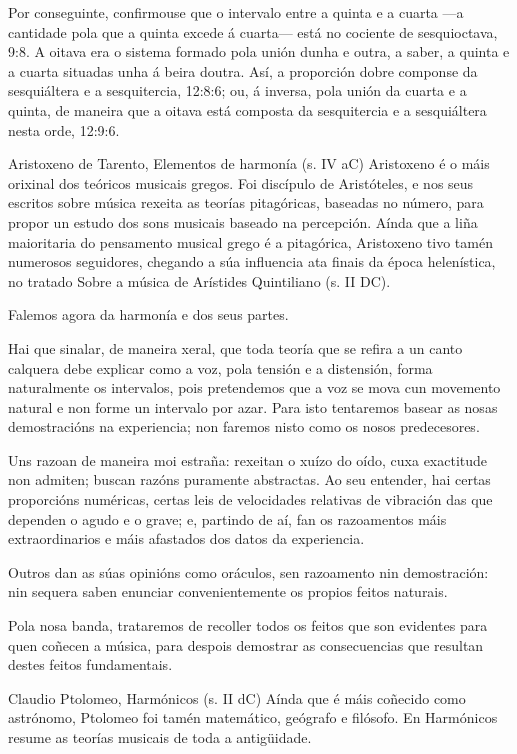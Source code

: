 Por conseguinte, confirmouse que o intervalo entre a quinta e a cuarta —a cantidade pola que a quinta excede á cuarta— está no cociente de sesquioctava, 9:8. A oitava era o sistema formado pola unión dunha e outra, a saber, a quinta e a cuarta situadas unha á beira doutra. Así, a proporción dobre componse da sesquiáltera e a sesquitercia, 12:8:6; ou, á inversa, pola unión da cuarta e a quinta, de maneira que a oitava está composta da sesquitercia e a sesquiáltera nesta orde, 12:9:6.

Aristoxeno de Tarento, Elementos de harmonía (s. IV aC)
Aristoxeno é o máis orixinal dos teóricos musicais gregos. Foi discípulo de Aristóteles, e nos seus escritos sobre música rexeita as teorías pitagóricas, baseadas no número, para propor un estudo dos sons musicais baseado na percepción. Aínda que a liña maioritaria do pensamento musical grego é a pitagórica, Aristoxeno tivo tamén numerosos seguidores, chegando a súa influencia ata finais da época helenística, no tratado Sobre a música de Arístides Quintiliano (s. II DC).

Falemos agora da harmonía e dos seus partes.

Hai que sinalar, de maneira xeral, que toda teoría que se refira a un canto calquera debe explicar como a voz, pola tensión e a distensión, forma naturalmente os intervalos, pois pretendemos que a voz se mova cun movemento natural e non forme un intervalo por azar. Para isto tentaremos basear as nosas demostracións na experiencia; non faremos nisto como os nosos predecesores.

Uns razoan de maneira moi estraña: rexeitan o xuízo do oído, cuxa exactitude non admiten; buscan razóns puramente abstractas. Ao seu entender, hai certas proporcións numéricas, certas leis de velocidades relativas de vibración das que dependen o agudo e o grave; e, partindo de aí, fan os razoamentos máis extraordinarios e máis afastados dos datos da experiencia.

Outros dan as súas opinións como oráculos, sen razoamento nin demostración: nin sequera saben enunciar convenientemente os propios feitos naturais.

Pola nosa banda, trataremos de recoller todos os feitos que son evidentes para quen coñecen a música, para despois demostrar as consecuencias que resultan destes feitos fundamentais.

Claudio Ptolomeo, Harmónicos (s. II dC)
Aínda que é máis coñecido como astrónomo, Ptolomeo foi tamén matemático, geógrafo e filósofo. En Harmónicos resume as teorías musicais de toda a antigüidade.

